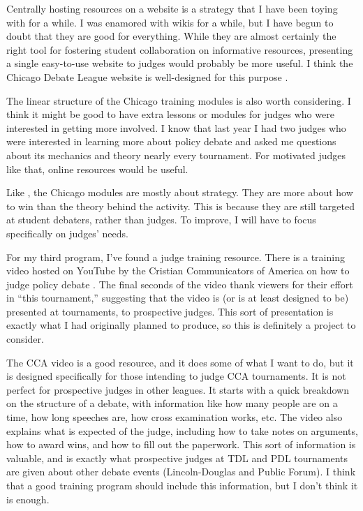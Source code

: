 \documentclass[man,12pt,natbib]{apa6}
\begin{document}
Centrally hosting resources on a website is a strategy that I have been toying
with for a while. I was enamored with wikis for a while, but I have begun to
doubt that they are good for everything. While they are almost certainly the
right tool for fostering student collaboration on informative resources,
presenting a single easy-to-use website to judges would probably be more
useful.
I think the Chicago Debate League website is well-designed for this purpose
\citep{ChicagoURL}.

The linear structure of the Chicago training modules is also worth considering.
I think it might be good to have extra lessons or modules for judges who were
interested in getting more involved.
I know that last year I had two judges who were interested in learning more
about policy debate and asked me questions about its mechanics and theory
nearly every tournament. For motivated judges like that, online resources would
be useful.

Like \citet{Bellon06}, the Chicago modules are mostly about strategy. They are
more about how to win than the theory behind the activity. This is because they
are still targeted at student debaters, rather than judges. To improve, I will
have to focus specifically on judges' needs.


For my third program, I've found a judge training resource. There is a training
video hosted on YouTube by the Cristian Communicators of America on how to
judge policy debate \citep{CCAvideo}. The final seconds of the video thank
viewers for their effort in ``this tournament,'' suggesting that the video is
(or is at least designed to be) presented at tournaments, to prospective
judges. This sort of presentation is exactly what I had originally planned to
produce, so this is definitely a project to consider.

The CCA video is a good resource, and it does some of what I want to do, but it
is designed specifically for those intending to judge CCA tournaments. It is
not perfect for prospective judges in other leagues. It starts with a quick
breakdown on the structure of a debate, with information like how many people
are on a time, how long speeches are, how cross examination works, etc. The
video also explains what is expected of the judge, including how to take notes
on arguments, how to award wins, and how to fill out the paperwork. This sort
of information is valuable, and is exactly what prospective judges at TDL and
PDL tournaments are given about other debate events (Lincoln-Douglas and Public
Forum). I think that a good training program should include this information,
but I don't think it is enough.
\end{document}
